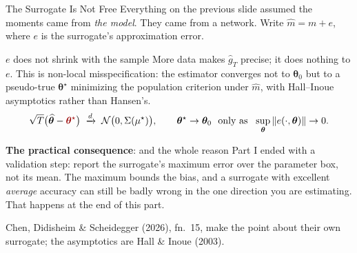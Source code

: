 \documentclass[aspectratio=169,11pt]{beamer}
\newcommand{\emphc}[1]{\textcolor{harvardcrimson}{#1}}
\newcommand{\str}{\bm{\theta}}          %
\begin{document}
\begin{frame}{The Surrogate Is Not Free}
\small
Everything on the previous slide assumed the moments came from \emph{the model}. They came from a network. Write $\widehat m = m + e$, where $e$ is the surrogate's approximation error.

\vspace{0.15cm}
\begin{alertblock}{$e$ does not shrink with the sample}
More data makes $\widehat g_T$ precise; it does nothing to $e$. This is \emphc{non-local misspecification}: the estimator converges not to $\str_0$ but to a \emphc{pseudo-true} $\str^\star$ minimizing the population criterion under $\widehat m$, with Hall--Inoue asymptotics rather than Hansen's.
\vspace{2pt}
\[
\sqrt{T}\bigl(\widehat{\str} - \emphc{\str^\star}\bigr) \;\xrightarrow{d}\; \mathcal{N}\bigl(0, \Sigma(\mu^\star)\bigr),
\qquad \str^\star \to \str_0 \ \text{ only as } \ \sup_{\str} \|e(\cdot,\str)\| \to 0 .
\]
\end{alertblock}

\vspace{0.1cm}
\textbf{The practical consequence}: and the whole reason Part I ended with a validation step: report the surrogate's \emphc{maximum} error over the parameter box, not its mean. The maximum bounds the bias, and a surrogate with excellent \emph{average} accuracy can still be badly wrong in the one direction you are estimating. That happens at the end of this part.

\vspace{0.05cm}
{\footnotesize Chen, Didisheim \& Scheidegger (2026), fn.\ 15, make the point about their own surrogate; the asymptotics are Hall \& Inoue (2003).}
\end{frame}
\end{document}
